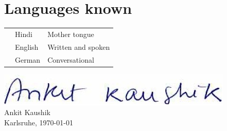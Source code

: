 \documentclass[11pt,a4paper]{article}
\begin{document}

\section*{Languages known}
	\begin{table}[h] %
		\begin{tabular}{p{.8cm}p{3.5cm}p{9.5cm}}
			& Hindi  		& Mother tongue\\
			& English 	& Written and spoken\\
			& German 	& Conversational\\ 
			
		\end{tabular}
	\end{table}
\vspace{.3cm}


\vspace{.4cm}
\noindent \includegraphics[height=.6cm]{SignAnkit3}\\
\noindent Ankit Kaushik\\
\noindent Karlsruhe, \today
\end{document}
